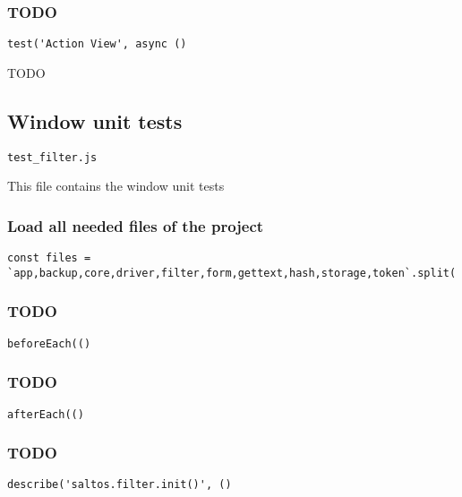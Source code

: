 \documentclass[a4paper]{article}
\begin{document}
\hypertarget{toc583}{}
\subsubsection{TODO}

\begin{lstlisting}
test('Action View', async ()
\end{lstlisting}

TODO

\hypertarget{toc584}{}
\subsection{Window unit tests}

\begin{lstlisting}
test_filter.js
\end{lstlisting}

This file contains the window unit tests

\hypertarget{toc585}{}
\subsubsection{Load all needed files of the project}

\begin{lstlisting}
const files = `app,backup,core,driver,filter,form,gettext,hash,storage,token`.split(',');
\end{lstlisting}

\hypertarget{toc586}{}
\subsubsection{TODO}

\begin{lstlisting}
beforeEach(()
\end{lstlisting}

\hypertarget{toc587}{}
\subsubsection{TODO}

\begin{lstlisting}
afterEach(()
\end{lstlisting}

\hypertarget{toc588}{}
\subsubsection{TODO}

\begin{lstlisting}
describe('saltos.filter.init()', ()
\end{lstlisting}
\end{document}
